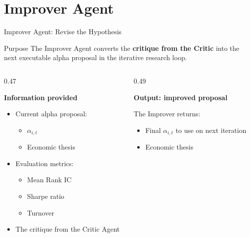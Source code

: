 \documentclass[10pt,aspectratio=169]{beamer}
\begin{document}
\section{Improver Agent}
\begin{frame}{Improver Agent: Revise the Hypothesis}

\small

\begin{block}{Purpose}
The Improver Agent converts the \textbf{critique from the Critic}
into the next executable alpha proposal in the iterative research loop.
\end{block}

\vspace{0.15cm}

\begin{columns}[T,onlytextwidth]

\begin{column}{0.47\textwidth}

\textbf{Information provided}

\begin{itemize}
    \item Current alpha proposal:
    \begin{itemize}
        \item $\alpha_{i,t}$
        \item Economic thesis
    \end{itemize}

    \item Evaluation metrics:
    \begin{itemize}
        \item Mean Rank IC
        \item Sharpe ratio
        \item Turnover
    \end{itemize}

    \item The critique from the Critic Agent
\end{itemize}

\end{column}

\begin{column}{0.49\textwidth}

\textbf{Output: improved proposal}

The Improver returns:

\begin{itemize}
    \item Final $\alpha_{i,t}$ to use on next iteration
    \item Economic thesis
\end{itemize}


\end{column}
\end{columns}
\end{frame}
\end{document}
